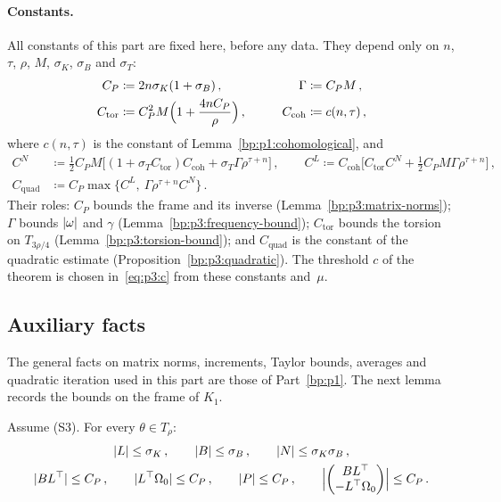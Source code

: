 \paragraph{Constants.} All constants of this part are fixed here, before any data. They depend only
on $n$, $\tau$, $\rho$, $M$, $\sigma_K$, $\sigma_B$ and $\sigma_T$:
\begin{equation}\label{eq:p3:constants}
\begin{aligned}
C_P&\coloneqq2n\sigma_K(1+\sigma_B)\,,&\qquad\Gamma&\coloneqq C_PM\,,\\
C_{\mathrm{tor}}&\coloneqq C_P^2M\Bigl(1+\frac{4nC_P}{\rho}\Bigr)\,,&\qquad
C_{\mathrm{coh}}&\coloneqq c(n,\tau)\,,
\end{aligned}
\end{equation}
where $c(n,\tau)$ is the constant of Lemma~\ref{bp:p1:cohomological}, and
\begin{equation}\label{eq:p3:Cquad}
\begin{aligned}
C^N&\coloneqq\tfrac12C_PM\bigl[(1+\sigma_TC_{\mathrm{tor}})C_{\mathrm{coh}}+\sigma_T\Gamma\rho^{\tau+n}
\bigr]\,,\qquad
C^L\coloneqq C_{\mathrm{coh}}\bigl[C_{\mathrm{tor}}C^N+\tfrac12C_PM\Gamma\rho^{\tau+n}\bigr]\,,\\
C_{\mathrm{quad}}&\coloneqq C_P\max\bigl\{C^L,\ \Gamma\rho^{\tau+n}C^N\bigr\}\,.
\end{aligned}
\end{equation}
Their roles: $C_P$ bounds the frame and its inverse (Lemma~\ref{bp:p3:matrix-norms}); $\Gamma$ bounds
$\lvert \omega\rvert$ and $\gamma$ (Lemma~\ref{bp:p3:frequency-bound}); $C_{\mathrm{tor}}$ bounds the torsion on
$T_{3\rho/4}$ (Lemma~\ref{bp:p3:torsion-bound}); and $C_{\mathrm{quad}}$ is the constant of the
quadratic estimate (Proposition~\ref{bp:p3:quadratic}). The threshold $c$ of the theorem is chosen
in~\eqref{eq:p3:c} from these constants and~$\mu$.

\subsection{Auxiliary facts}\label{bp:p3:auxiliary}

The general facts on matrix norms, increments, Taylor bounds, averages and quadratic iteration used in
this part are those of Part~\ref{bp:p1}. The next lemma records the bounds on the frame of $K_1$.

\begin{lemma}\label{bp:p3:matrix-norms}
Assume (S3). For every $\theta\in T_\rho$:
\begin{gather*}
\lvert L\rvert\le\sigma_K\,,\qquad\lvert B\rvert\le\sigma_B\,,\qquad\lvert N\rvert\le\sigma_K\sigma_B\,,\\
\lvert BL^\top\rvert\le C_P\,,\qquad\lvert L^\top\Omega_0\rvert\le C_P\,,\qquad\lvert P\rvert\le C_P\,,\qquad
\Bigl|\begin{pmatrix}BL^\top\\-L^\top\Omega_0\end{pmatrix}\Bigr|\le C_P\,.
\end{gather*}
\end{lemma}

